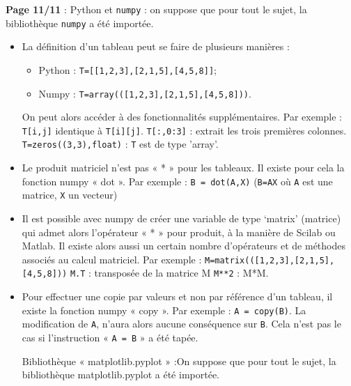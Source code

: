 \documentclass[10pt,fleqn]{article} %
\begin{document}
 
 
\textbf{Page 11/11} : Python et \texttt{numpy} : on suppose que pour tout le sujet, la bibliothèque \texttt{numpy} a été importée.
\begin{itemize}
\item La définition d’un tableau peut se faire de plusieurs manières :
\begin{itemize}
\item	Python : \texttt{T=[[1,2,3],[2,1,5],[4,5,8]]};
\item	Numpy : \texttt{T=array(([1,2,3],[2,1,5],[4,5,8]))}.
\end{itemize}
On peut alors accéder à des fonctionnalités supplémentaires. Par exemple :
\texttt{T[i,j]} identique à \texttt{T[i][j]}. \texttt{T[:,0:3]} : extrait les trois premières colonnes.
\texttt{T=zeros((3,3),float)} : \texttt{T} est de type ’array’.
\item	Le produit matriciel n’est pas « * » pour les tableaux. Il existe pour cela la fonction numpy « dot ».
Par exemple : \texttt{B = dot(A,X)} (\texttt{B=AX} où \texttt{A} est une matrice, \texttt{X} un vecteur)
\item	Il est possible avec numpy de créer une variable de type ‘matrix’ (matrice) qui admet alors l’opérateur « * » pour produit, à la manière de Scilab ou Matlab. Il existe alors aussi un certain nombre d’opérateurs et de méthodes associés au calcul matriciel.
Par exemple :  \texttt{M=matrix(([1,2,3],[2,1,5],[4,5,8]))}
		\texttt{M.T} : transposée de la matrice M
		\texttt{M**2} : M*M.
\item	Pour effectuer une copie par valeurs et non par référence d’un tableau, il existe la fonction numpy « copy ». Par exemple : \texttt{A = copy(B)}. La modification de \texttt{A}, n’aura alors aucune conséquence sur \texttt{B}.
Cela n’est pas le cas si l’instruction « \texttt{A = B} » a été tapée.

Bibliothèque « matplotlib.pyplot » :On suppose que pour tout le sujet, la bibliothèque matplotlib.pyplot a été importée.
\end{itemize}
\end{document}
